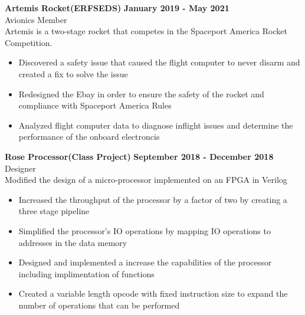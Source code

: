 \documentclass[10pt]{article}
\newcommand{\entrySpacing}{4pt}
\begin{document}
\noindent\begin{minipage}{\linewidth}
\textbf{Artemis Rocket(ERFSEDS)} \hfill \textbf{January 2019 - May 2021}\\
Avionics Member\hfill \\Artemis is a two-stage rocket that competes in the Spaceport America Rocket Competition.
\begin{itemize}[noitemsep,nolistsep]
\item Discovered a safety issue that caused the flight computer to never disarm and created a fix to solve the issue
\item Redesigned the Ebay in order to ensure the safety of the rocket and compliance with Spaceport America Rules
\item Analyzed flight computer data to diagnose inflight issues and determine the performance of the onboard electroncis
\end{itemize}


\end{minipage}
\vspace{\entrySpacing}

\noindent\begin{minipage}{\linewidth}
\textbf{Rose Processor(Class Project)} \hfill \textbf{September 2018 - December 2018}\\
Designer\hfill \\Modified the design of a micro-processor implemented on an FPGA in Verilog
\begin{itemize}[noitemsep,nolistsep]
\item Increased the throughput of the processor by a factor of two by creating a three stage pipeline
\item Simplified the processor’s IO operations by mapping IO operations to addresses in the data memory
\item Designed and implemented a increase the capabilities of the processor including implimentation of functions
\item Created a variable length opcode with fixed instruction size to expand the number of operations that can be performed
\end{itemize}


\end{minipage}
\vspace{\entrySpacing}
\end{document}
